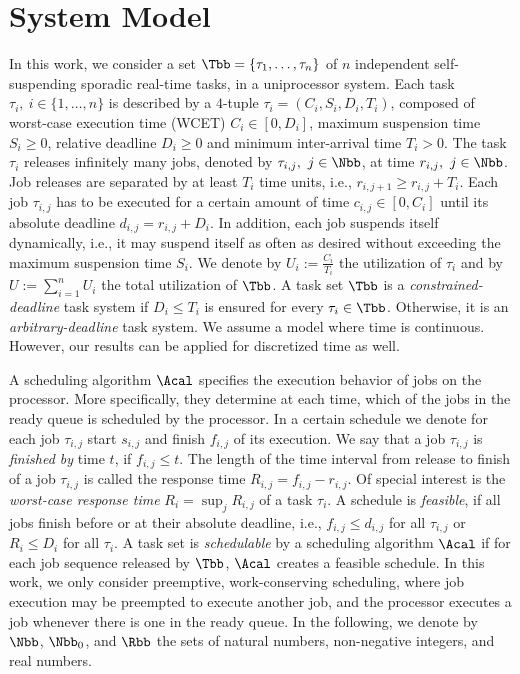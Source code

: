 \documentclass[conference]{IEEEtran}
\theoremstyle{definition}
\theoremstyle{remark}
\begin{document}
	

	
\section{System Model}
\label{sec:system_model}

In this work, we consider a set $\Tbb=\{\tau_1, \dots, \tau_n\}$ of $n$ independent self-suspending sporadic real-time tasks, in a uniprocessor system.
Each task $\tau_i,~i \in \{1,\dots, n\}$ is described by a $4$-tuple $\tau_i = (C_i, S_i, D_i, T_i)$, composed of worst-case execution time (WCET) $C_i \in [0,D_i]$, maximum suspension time $S_i\geq 0$, relative deadline $D_i\geq0$ and minimum inter-arrival time $T_i>0$.
The task $\tau_i$ releases infinitely many jobs, denoted by $\tau_{i,j},~j \in \Nbb$, at time $r_{i,j},~j \in \Nbb$.
Job releases are separated by at least $T_i$ time units, i.e., $r_{i,j+1} \geq r_{i,j} + T_i$.
Each job $\tau_{i,j}$ has to be executed for a certain amount of time $c_{i,j} \in [0,C_i]$ until its absolute deadline $d_{i,j} = r_{i,j} + D_i$.
In addition, each job suspends itself dynamically, i.e., it may suspend itself as often as desired without exceeding the maximum suspension time $S_i$.
We denote by $U_i := \frac{C_i}{T_i}$ the utilization of $\tau_i$ and by $U := \sum_{i=1}^{n} U_i$ the total utilization of $\Tbb$.
%
A task set $\Tbb$ is a \emph{constrained-deadline} task system if
$D_i \leq T_i$ is ensured for every $\tau_i \in \Tbb$. Otherwise, it is an
\emph{arbitrary-deadline} task system.
We assume a model where time is continuous. However, our results can be applied for discretized time as well.

A scheduling algorithm $\Acal$ specifies the execution behavior of jobs on the processor.
More specifically, they determine at each time, which of the jobs in the ready queue is scheduled by the processor.
In a certain schedule we denote for each job $\tau_{i,j}$ start $s_{i,j}$ and finish $f_{i,j}$ of its execution.
We say that a job $\tau_{i,j}$ is \emph{finished by} time $t$, if $f_{i,j}\leq t$. 
The length of the time interval from release to finish of a job $\tau_{i,j}$ is called the {response time} $R_{i,j} = f_{i,j}-r_{i,j}$.
Of special interest is the \emph{worst-case response time} $R_i = \sup_j R_{i,j}$ of a task $\tau_i$.
A schedule is \emph{feasible}, if all jobs finish before or at their absolute deadline, i.e., $f_{i,j} \leq d_{i,j}$ for all $\tau_{i,j}$ or $R_i \leq D_i$ for all $\tau_i$.
A task set is \emph{schedulable} by a scheduling algorithm $\Acal$ if for each job sequence released by $\Tbb$, $\Acal$ creates a feasible schedule.
In this work, we only consider preemptive, work-conserving scheduling, where job execution may be preempted to execute another job, and the processor executes a job whenever there is one in the ready queue.
%
In the following, we denote by $\Nbb$, $\Nbb_0$, and $\Rbb$ the sets of natural numbers, non-negative integers, and real numbers.
\end{document}
